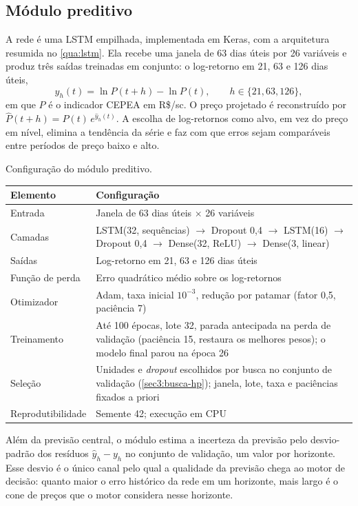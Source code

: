 \subsection{Módulo preditivo}

A rede é uma LSTM empilhada, implementada em Keras, com a arquitetura resumida no \autoref{qua:lstm}. Ela recebe uma janela de 63 dias úteis por 26 variáveis e produz três saídas treinadas em conjunto: o log-retorno em 21, 63 e 126 dias úteis,
\begin{equation}
	y_h(t) = \ln P(t+h) - \ln P(t), \qquad h \in \{21, 63, 126\},
\end{equation}
em que $P$ é o indicador CEPEA em R\$/sc. O preço projetado é reconstruído por $\hat{P}(t+h) = P(t)\,e^{\hat{y}_h(t)}$. A escolha de log-retornos como alvo, em vez do preço em nível, elimina a tendência da série e faz com que erros sejam comparáveis entre períodos de preço baixo e alto.

\begin{quadro}[htb]
	\centering
	\caption{Configuração do módulo preditivo.}\label{qua:lstm}
	\begin{tabular}{L{4cm} L{10cm}}
		\hline
		\textbf{Elemento} & \textbf{Configuração} \\ \hline
		Entrada & Janela de 63 dias úteis $\times$ 26 variáveis \\
		Camadas & LSTM(32, sequências) $\to$ Dropout 0,4 $\to$ LSTM(16) $\to$ Dropout 0,4 $\to$ Dense(32, ReLU) $\to$ Dense(3, linear) \\
		Saídas & Log-retorno em 21, 63 e 126 dias úteis \\
		Função de perda & Erro quadrático médio sobre os log-retornos \\
		Otimizador & Adam, taxa inicial $10^{-3}$, redução por patamar (fator 0,5, paciência 7) \\
		Treinamento & Até 100 épocas, lote 32, parada antecipada na perda de validação (paciência 15, restaura os melhores pesos); o modelo final parou na época 26 \\
		Seleção & Unidades e \textit{dropout} escolhidos por busca no conjunto de validação (\autoref{sec3:busca-hp}); janela, lote, taxa e paciências fixados a priori \\
		Reprodutibilidade & Semente 42; execução em CPU \\ \hline
	\end{tabular}
\end{quadro}

Além da previsão central, o módulo estima a incerteza da previsão pelo desvio-padrão dos resíduos $\hat{y}_h - y_h$ no conjunto de validação, um valor por horizonte. Esse desvio é o único canal pelo qual a qualidade da previsão chega ao motor de decisão: quanto maior o erro histórico da rede em um horizonte, mais largo é o cone de preços que o motor considera nesse horizonte.

